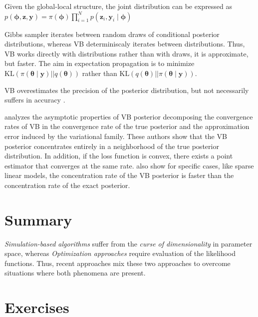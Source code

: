 Given the global-local structure, the joint distribution can be expressed as $p(\boldsymbol{\phi},\boldsymbol{z},\boldsymbol{y})=\pi(\boldsymbol{\phi})\prod_{i=1}^{N}p(\boldsymbol{z}_i,\boldsymbol{y}_i\mid \boldsymbol{\phi})$ 

Gibbs sampler iterates between random draws of conditional posterior distributions, whereas VB determiniscaly iterates between distributions. Thus, VB works directly with distributions rather than with draws, it is approximate, but faster. The aim in expectation propagation is to minimize $\text{KL}(\pi(\boldsymbol{\theta} \mid \mathbf{y})||q(\boldsymbol{\theta}))$ rather than $\text{KL}(q(\boldsymbol{\theta})||\pi(\boldsymbol{\theta} \mid \mathbf{y}))$.  

VB overestimates the precision of the posterior distribution, but not necessarily suffers in accuracy \cite{blei2017variational}.

\cite{zhang2020convergence} analyzes the asymptotic properties of VB posterior decomposing the convergence rates of VB in the convergence rate of the true posterior and the approximation error induced by the variational family. These authors show that the VB posterior concentrates entirely in a neighborhood of the true posterior distribution. In addition, if the loss function is convex, there exists a point estimator that converges at the same rate. \cite{zhang2020convergence} also show for specific cases, like sparse linear models, the concentration rate of the VB posterior is faster than the concentration rate of the exact posterior.  

\section{Summary}\label{sec15_3}
\textit{Simulation-based algorithms} suffer from the \textit{curse of dimensionality} in parameter space, whereas \textit{Optimization approaches} require evaluation of the likelihood functions. Thus, recent approaches mix these two approaches to overcome situations where both phenomena are present.

\section{Exercises}\label{sec15_4}

